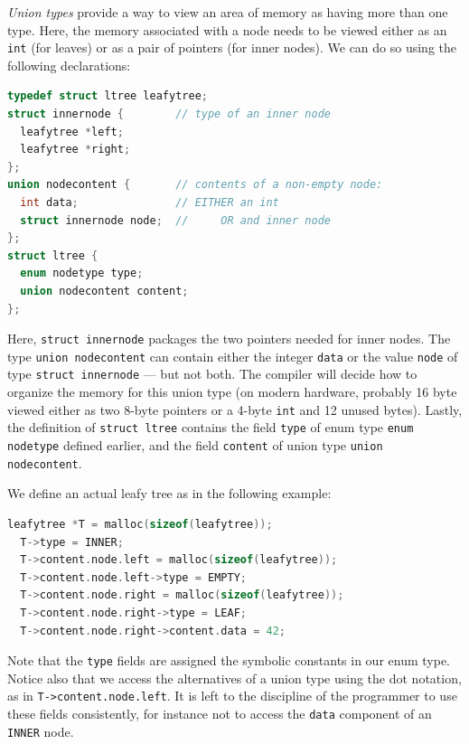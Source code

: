 \emph{Union types} provide a way to view an area of memory as having
more than one type.  Here, the memory associated with a node needs to
be viewed either as an \lstinline'int' (for leaves) or as a pair of
pointers (for inner nodes).  We can do so using the following
declarations:
\begin{lstlisting}[language=c]
typedef struct ltree leafytree;
struct innernode {        // type of an inner node
  leafytree *left;
  leafytree *right;
};
union nodecontent {       // contents of a non-empty node:
  int data;               // EITHER an int
  struct innernode node;  //     OR and inner node
};
struct ltree {
  enum nodetype type;
  union nodecontent content;
};
\end{lstlisting}
Here, \lstinline'struct innernode' packages the two pointers needed
for inner nodes.  The type \lstinline'union nodecontent' can contain
either the integer \lstinline'data' or the value \lstinline'node' of
type \lstinline'struct innernode' --- but not both.  The compiler will
decide how to organize the memory for this union type (on modern
hardware, probably 16 byte viewed either as two 8-byte pointers or a
4-byte \lstinline'int' and 12 unused bytes).  Lastly, the definition of
\lstinline'struct ltree' contains the field \lstinline'type' of enum
type \lstinline'enum nodetype' defined earlier, and the field
\lstinline'content' of union type \lstinline'union nodecontent'.


We define an actual leafy tree as in the following example:
\begin{lstlisting}[language=c]
  leafytree *T = malloc(sizeof(leafytree));
  T->type = INNER;
  T->content.node.left = malloc(sizeof(leafytree));
  T->content.node.left->type = EMPTY;
  T->content.node.right = malloc(sizeof(leafytree));
  T->content.node.right->type = LEAF;
  T->content.node.right->content.data = 42;
\end{lstlisting}
Note that the \lstinline'type' fields are assigned the symbolic
constants in our enum type.  Notice also that we access the
alternatives of a union type using the dot notation, as in
\lstinline'T->content.node.left'.  It is left to the discipline of the
programmer to use these fields consistently, for instance not to
access the \lstinline'data' component of an \lstinline'INNER' node.

